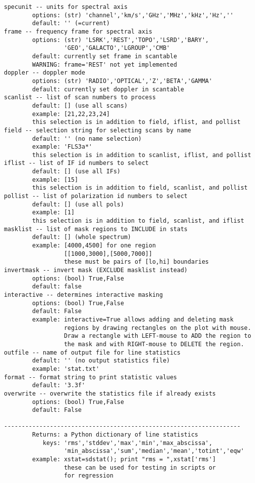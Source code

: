 \begin{verbatim}
specunit -- units for spectral axis
        options: (str) 'channel','km/s','GHz','MHz','kHz','Hz',''
        default: '' (=current)
frame -- frequency frame for spectral axis
        options: (str) 'LSRK','REST','TOPO','LSRD','BARY',
                 'GEO','GALACTO','LGROUP','CMB'
        default: currently set frame in scantable
        WARNING: frame='REST' not yet implemented
doppler -- doppler mode
        options: (str) 'RADIO','OPTICAL','Z','BETA','GAMMA'
        default: currently set doppler in scantable
scanlist -- list of scan numbers to process
        default: [] (use all scans)
        example: [21,22,23,24]
        this selection is in addition to field, iflist, and pollist
field -- selection string for selecting scans by name
        default: '' (no name selection)
        example: 'FLS3a*'
        this selection is in addition to scanlist, iflist, and pollist
iflist -- list of IF id numbers to select
        default: [] (use all IFs)
        example: [15]
        this selection is in addition to field, scanlist, and pollist
pollist -- list of polarization id numbers to select
        default: [] (use all pols)
        example: [1]
        this selection is in addition to field, scanlist, and iflist
masklist -- list of mask regions to INCLUDE in stats
        default: [] (whole spectrum)
        example: [4000,4500] for one region
                 [[1000,3000],[5000,7000]]
                 these must be pairs of [lo,hi] boundaries
invertmask -- invert mask (EXCLUDE masklist instead)
        options: (bool) True,False
        default: false
interactive -- determines interactive masking
        options: (bool) True,False
        default: False
        example: interactive=True allows adding and deleting mask 
                 regions by drawing rectangles on the plot with mouse. 
                 Draw a rectangle with LEFT-mouse to ADD the region to 
                 the mask and with RIGHT-mouse to DELETE the region. 
outfile -- name of output file for line statistics
        default: '' (no output statistics file)
        example: 'stat.txt'
format -- format string to print statistic values
        default: '3.3f'
overwrite -- overwrite the statistics file if already exists 
        options: (bool) True,False
        default: False

-------------------------------------------------------------------
        Returns: a Python dictionary of line statistics
           keys: 'rms','stddev','max','min','max_abscissa',
                 'min_abscissa','sum','median','mean','totint','eqw'
        example: xstat=sdstat(); print "rms = ",xstat['rms']
                 these can be used for testing in scripts or
                 for regression


\end{verbatim}
